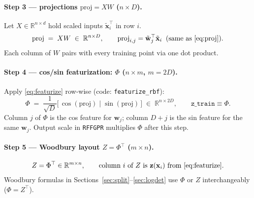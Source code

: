 \documentclass[11pt]{article}
\newcommand{\Ph}{\Phi}
\newcommand{\Zmat}{Z}
\begin{document}
\paragraph{Step 3 --- projections $\mathrm{proj}=XW$ ($n\times D$).}
Let $X\in\mathbb{R}^{n\times d}$ hold scaled inputs $\tilde{\mathbf x}_i^{\top}$ in row $i$.
\begin{equation}
  \label{eq:proj-matrix}
  \mathrm{proj}
  \;=\;
  X W
  \;\in\; \mathbb{R}^{n \times D},
  \qquad
  \mathrm{proj}_{i,j} = \tilde{\mathbf w}_j^{\top}\tilde{\mathbf x}_i
  \;\;\text{(same as \eqref{eq:proj}).}
\end{equation}
Each column of $W$ pairs with every training point via one dot product.

\paragraph{Step 4 --- cos/sin featurization: $\Ph$ ($n\times m$, $m=2D$).}
Apply \eqref{eq:featurize} row-wise (code: \texttt{featurize\_rbf}):
\begin{equation}
  \label{eq:Ph-from-W}
  \Ph
  \;=\;
  \frac{1}{\sqrt{D}}
  \bigl[\,
    \cos(\mathrm{proj}) \;\big|\; \sin(\mathrm{proj})
  \,\bigr]
  \;\in\; \mathbb{R}^{n \times 2D},
  \qquad
  \texttt{z\_train} \equiv \Ph.
\end{equation}
Column $j$ of $\Ph$ is the cos feature for $\mathbf w_j$; column $D+j$ is the sin feature for the same $\mathbf w_j$.
Output scale in \texttt{RFFGPR} multiplies $\Ph$ after this step.

\paragraph{Step 5 --- Woodbury layout $\Zmat=\Ph^{\top}$ ($m\times n$).}
\begin{equation}
  \Zmat = \Ph^{\top} \in \mathbb{R}^{m \times n},
  \qquad
  \text{column $i$ of $\Zmat$ is $\mathbf z(\mathbf x_i)$ from \eqref{eq:featurize}.}
\end{equation}
Woodbury formulas in Sections~\ref{sec:split}--\ref{sec:logdet} use $\Ph$ or $\Zmat$ interchangeably ($\Ph=\Zmat^{\top}$).
\end{document}
